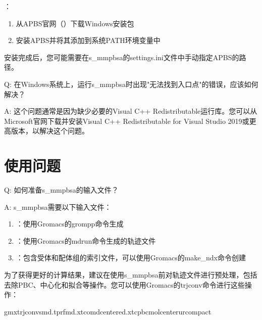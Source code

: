 \documentclass[letterpaper,10pt,english]{sphinxmanual}
\begin{document}
\sphinxAtStartPar
{}：
\begin{enumerate}
%
\item {} 
\sphinxAtStartPar
从APBS官网（）下载Windows安装包

\item {} 
\sphinxAtStartPar
安装APBS并将其添加到系统PATH环境变量中

\end{enumerate}

\sphinxAtStartPar
安装完成后，您可能需要在s\_mmpbsa的settings.ini文件中手动指定APBS的路径。

\sphinxAtStartPar
Q: 在Windows系统上，运行s\_mmpbsa时出现"无法找到入口点"的错误，应该如何解决？

\sphinxAtStartPar
A: 这个问题通常是因为缺少必要的Visual C++ Redistributable运行库。您可以从Microsoft官网下载并安装Visual C++ Redistributable for Visual Studio 2019或更高版本，以解决这个问题。


\section{使用问题}
\label{\detokenize{faq:id3}}
\sphinxAtStartPar
Q: 如何准备s\_mmpbsa的输入文件？

\sphinxAtStartPar
A: s\_mmpbsa需要以下输入文件：
\begin{enumerate}
%
\item {} 
\sphinxAtStartPar
{}：使用Gromacs的grompp命令生成

\item {} 
\sphinxAtStartPar
{}：使用Gromacs的mdrun命令生成的轨迹文件

\item {} 
\sphinxAtStartPar
{}：包含受体和配体组的索引文件，可以使用Gromacs的make\_ndx命令创建

\end{enumerate}

\sphinxAtStartPar
为了获得更好的计算结果，建议在使用s\_mmpbsa前对轨迹文件进行预处理，包括去除PBC、中心化和拟合等操作。您可以使用Gromacs的trjconv命令进行这些操作：

\begin{sphinxVerbatim}[commandchars=\\\{\}]
gmxtrjconv\PYGZhy{}smd.tpr\PYGZhy{}fmd.xtc\PYGZhy{}omd\PYGZus{}centered.xtc\PYGZhy{}pbcmol\PYGZhy{}center\PYGZhy{}urcompact
\end{sphinxVerbatim}
\end{document}
